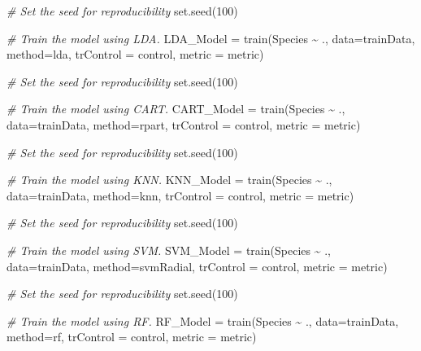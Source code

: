 \documentclass[
]{article}
\newenvironment{Shaded}{\begin{snugshade}}{\end{snugshade}}
\newcommand{\AttributeTok}[1]{\textcolor[rgb]{0.77,0.63,0.00}{#1}}
\newcommand{\CommentTok}[1]{\textcolor[rgb]{0.56,0.35,0.01}{\textit{#1}}}
\newcommand{\DecValTok}[1]{\textcolor[rgb]{0.00,0.00,0.81}{#1}}
\newcommand{\FunctionTok}[1]{\textcolor[rgb]{0.00,0.00,0.00}{#1}}
\newcommand{\NormalTok}[1]{#1}
\newcommand{\OtherTok}[1]{\textcolor[rgb]{0.56,0.35,0.01}{#1}}
\newcommand{\SpecialCharTok}[1]{\textcolor[rgb]{0.00,0.00,0.00}{#1}}
\newcommand{\StringTok}[1]{\textcolor[rgb]{0.31,0.60,0.02}{#1}}
\begin{document}
\begin{Shaded}
\begin{Highlighting}[]
\CommentTok{\# Set the seed for reproducibility}
\FunctionTok{set.seed}\NormalTok{(}\DecValTok{100}\NormalTok{)}

\CommentTok{\# Train the model using LDA.}
\NormalTok{LDA\_Model }\OtherTok{=} \FunctionTok{train}\NormalTok{(Species }\SpecialCharTok{\textasciitilde{}}\NormalTok{ ., }\AttributeTok{data=}\NormalTok{trainData, }\AttributeTok{method=}\StringTok{\textquotesingle{}lda\textquotesingle{}}\NormalTok{, }
                  \AttributeTok{trControl =}\NormalTok{ control, }\AttributeTok{metric =}\NormalTok{ metric)}


\CommentTok{\# Set the seed for reproducibility}
\FunctionTok{set.seed}\NormalTok{(}\DecValTok{100}\NormalTok{)}

\CommentTok{\# Train the model using CART.}
\NormalTok{CART\_Model }\OtherTok{=} \FunctionTok{train}\NormalTok{(Species }\SpecialCharTok{\textasciitilde{}}\NormalTok{ ., }\AttributeTok{data=}\NormalTok{trainData, }\AttributeTok{method=}\StringTok{\textquotesingle{}rpart\textquotesingle{}}\NormalTok{, }
                  \AttributeTok{trControl =}\NormalTok{ control, }\AttributeTok{metric =}\NormalTok{ metric)}


\CommentTok{\# Set the seed for reproducibility}
\FunctionTok{set.seed}\NormalTok{(}\DecValTok{100}\NormalTok{)}

\CommentTok{\# Train the model using KNN.}
\NormalTok{KNN\_Model }\OtherTok{=} \FunctionTok{train}\NormalTok{(Species }\SpecialCharTok{\textasciitilde{}}\NormalTok{ ., }\AttributeTok{data=}\NormalTok{trainData, }\AttributeTok{method=}\StringTok{\textquotesingle{}knn\textquotesingle{}}\NormalTok{, }
                  \AttributeTok{trControl =}\NormalTok{ control, }\AttributeTok{metric =}\NormalTok{ metric)}


\CommentTok{\# Set the seed for reproducibility}
\FunctionTok{set.seed}\NormalTok{(}\DecValTok{100}\NormalTok{)}

\CommentTok{\# Train the model using SVM.}
\NormalTok{SVM\_Model }\OtherTok{=} \FunctionTok{train}\NormalTok{(Species }\SpecialCharTok{\textasciitilde{}}\NormalTok{ ., }\AttributeTok{data=}\NormalTok{trainData, }\AttributeTok{method=}\StringTok{\textquotesingle{}svmRadial\textquotesingle{}}\NormalTok{, }
                  \AttributeTok{trControl =}\NormalTok{ control, }\AttributeTok{metric =}\NormalTok{ metric)}


\CommentTok{\# Set the seed for reproducibility}
\FunctionTok{set.seed}\NormalTok{(}\DecValTok{100}\NormalTok{)}

\CommentTok{\# Train the model using RF.}
\NormalTok{RF\_Model }\OtherTok{=} \FunctionTok{train}\NormalTok{(Species }\SpecialCharTok{\textasciitilde{}}\NormalTok{ ., }\AttributeTok{data=}\NormalTok{trainData, }\AttributeTok{method=}\StringTok{\textquotesingle{}rf\textquotesingle{}}\NormalTok{, }
                  \AttributeTok{trControl =}\NormalTok{ control, }\AttributeTok{metric =}\NormalTok{ metric)}
\end{Highlighting}
\end{Shaded}
\end{document}

